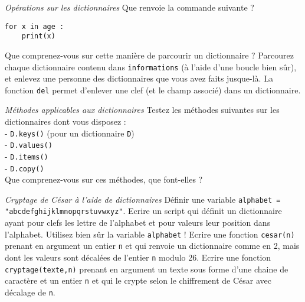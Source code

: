 \ques \textit{Opérations sur les dictionnaires}
\ssques Que renvoie la commande suivante ?
\begin{verbatim}
for x in age :
    print(x)
\end{verbatim}
Que comprenez-vous sur cette manière de parcourir un dictionnaire ?
\ssques Parcourez chaque dictionnaire contenu dans \texttt{informations} (à l'aide d'une boucle bien sûr), et enlevez une personne des dictionnaires que vous avez faits jusque-là. La fonction \texttt{del} permet d'enlever une clef (et le champ associé) dans un dictionnaire.

\newpage
\ques \textit{Méthodes applicables aux dictionnaires}
Testez les méthodes suivantes sur les dictionnaires dont vous disposez : \\
- \texttt{D.keys()} (pour un dictionnaire \texttt{D})\\
- \texttt{D.values()} \\
- \texttt{D.items()} \\
- \texttt{D.copy()} \\
Que comprenez-vous sur ces méthodes, que font-elles ?

\textit{Cryptage de César à l'aide de dictionnaires}
\ques  Définir une variable \texttt{alphabet = "abcdefghijklmnopqrstuvwxyz"}.
\ques Ecrire un script qui définit un dictionnaire ayant pour clefs les lettre de l'alphabet et pour valeurs leur position dans l'alphabet. Utilisez bien sûr la variable \texttt{alphabet} !
\ques Ecrire une fonction \texttt{cesar(n)} prenant en argument un entier \texttt{n} et qui renvoie un dictionnaire comme en 2, mais dont les valeurs sont décalées de l'entier \texttt{n} modulo 26.
\ques Ecrire une fonction \texttt{cryptage(texte,n)} prenant en argument un texte sous forme d'une chaine de caractère et un entier \texttt{n} et qui le crypte selon le chiffrement de César avec décalage de \texttt{n}.
